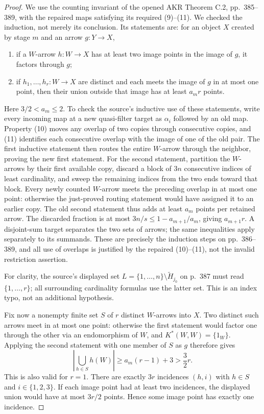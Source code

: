 \begin{proof}
We use the counting invariant of the opened AKR Theorem C.2,
pp.~385--389, with the repaired maps satisfying its required (9)--(11).
We checked the induction, not merely its conclusion. Its statements are:
for an object $X$ created by stage $m$ and an arrow $g:Y\to X$,
\begin{enumerate}
\item if a $W$-arrow $h:W\to X$ has at least two image points in the
image of $g$, it factors through $g$;
\item if $h_1,\ldots,h_r:W\to X$ are distinct and each meets the image
of $g$ in at most one point, then their union outside that image has
at least $a_mr$ points.
\end{enumerate}
Here $3/2<a_m\leq2$. To check the source's inductive use of these
statements, write every incoming map at a new quasi-filter target as
$\alpha_i$ followed by an old map. Property (10) moves any overlap of
two copies through consecutive copies, and (11) identifies each
consecutive overlap with the image of one of the old pair. The first
inductive statement then routes the entire $W$-arrow through the
neighbor, proving the new first statement. For the second statement,
partition the $W$-arrows by their first available copy, discard a block
of $3n$ consecutive indices of least cardinality, and sweep the
remaining indices from the two ends toward that block. Every newly
counted $W$-arrow meets the preceding overlap in at most one point:
otherwise the just-proved routing statement would have assigned it to
an earlier copy. The old second statement thus adds at least $a_m$
points per retained arrow. The discarded fraction is at most
$3n/s\leq1-a_{m+1}/a_m$, giving $a_{m+1}r$. A disjoint-sum target
separates the two sets of arrows; the same inequalities apply separately
to its summands. These are precisely the induction steps on
pp.~386--389, and all use of overlaps is justified by the repaired
(10)--(11), not the invalid restriction assertion.

For clarity, the source's displayed set $L=\{1,\ldots,n\}\setminus
\widetilde H_{j_0}$ on p.~387 must read $\{1,\ldots,r\}$; all surrounding
cardinality formulas use the latter set. This is an index typo, not an
additional hypothesis.

Fix now a nonempty finite set $S$ of $r$ distinct $W$-arrows into $X$.
Two distinct such arrows meet in at most one point: otherwise the first
statement would factor one through the other via an endomorphism of
$W$, and $K^*(W,W)=\{1_W\}$. Applying the second statement with one
member of $S$ as $g$ therefore gives
\[
 \left|\bigcup_{h\in S}h(W)\right|
 \geq a_m(r-1)+3>\frac32r.
\]
This is also valid for $r=1$. There are exactly $3r$ incidences
$(h,i)$ with $h\in S$ and $i\in\{1,2,3\}$. If each image point had
at least two incidences, the displayed union would have at most
$3r/2$ points. Hence some image point has exactly one incidence.


\end{proof}

